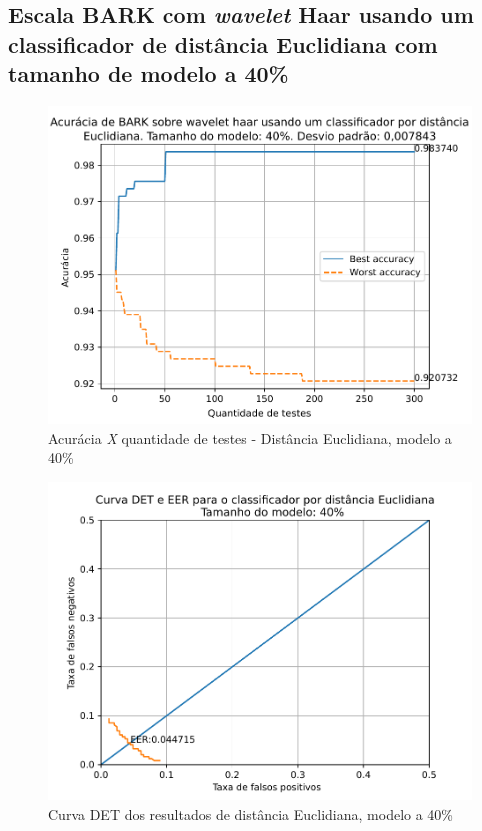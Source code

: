 			\FloatBarrier
		\subsection{Escala BARK com \textit{wavelet} Haar usando um classificador de distância Euclidiana com tamanho de modelo a 40\%}
		
			
			
			\begin{figure}[ht]
				\centering
				\includegraphics[width=\linewidth]{images/results/confusionMatrices/classifier_Euclidian_40}
				\caption{Acurácia \textit{X} quantidade de testes - Distância Euclidiana, modelo a 40\%}
				\label{fig:classifiereuclidian40}
			\end{figure}
		
			\begin{figure}[!ht]
				\centering
				\includegraphics[width=\linewidth]{images/results/det/DET_for_classifier_Euclidian_40}
				\caption{Curva DET dos resultados de distância Euclidiana, modelo a 40\%}
				\label{fig:detforclassifiereuclidian40}
			\end{figure}

